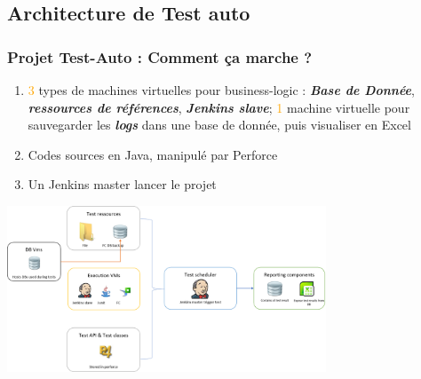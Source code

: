 \documentclass{beamer}
\begin{document}
        \subsection{Architecture de Test auto}
        \begin{frame}
            \frametitle{Projet Test-Auto : Comment ça marche ?}
            \begin{enumerate}
                \item \textcolor{orange}{3} types de machines virtuelles pour business-logic : \textit{\textbf{Base de Donnée}}, \textit{\textbf{ressources de références}}, \textit{\textbf{Jenkins slave}}; \textcolor{orange}{1} machine virtuelle pour sauvegarder  les \textit{\textbf{logs}} dans une base de donnée, puis visualiser en Excel
                \item Codes sources en Java, manipulé par Perforce
                \item Un Jenkins master lancer le projet
            \end{enumerate}
        
            \centering
            \includegraphics[width=9.5cm]{TestAuto_architecture.png}
        \end{frame}
        
\end{document}
